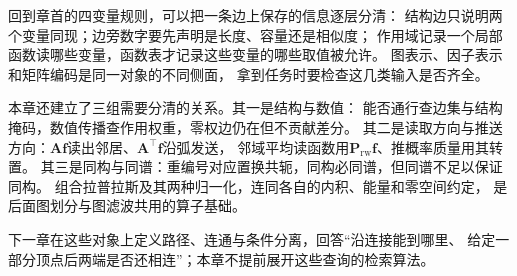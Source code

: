 回到章首的四变量规则，可以把一条边上保存的信息逐层分清：
结构边只说明两个变量同现；边旁数字要先声明是长度、容量还是相似度；
作用域记录一个局部函数读哪些变量，函数表才记录这些变量的哪些取值被允许。
图表示、因子表示和矩阵编码是同一对象的不同侧面，
拿到任务时要检查这几类输入是否齐全。

本章还建立了三组需要分清的关系。其一是结构与数值：
能否通行查边集与结构掩码，数值传播查作用权重，零权边仍在但不贡献差分。
其二是读取方向与推送方向：$\bm A\bm f$读出邻居、$\bm A^\top\bm f$沿弧发送，
邻域平均读函数用$\bm P_{\mathrm{rw}}\bm f$、推概率质量用其转置。
其三是同构与同谱：重编号对应置换共轭，同构必同谱，但同谱不足以保证同构。
组合拉普拉斯及其两种归一化，连同各自的内积、能量和零空间约定，
是后面图划分与图滤波共用的算子基础。

下一章在这些对象上定义路径、连通与条件分离，回答“沿连接能到哪里、
给定一部分顶点后两端是否还相连”；本章不提前展开这些查询的检索算法。
